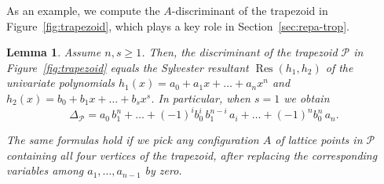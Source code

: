\documentclass[11pt]{amsart}
\numberwithin{equation}{section}
\theoremstyle{plain}
\newtheorem{lemma}[theorem]{Lemma}
\theoremstyle{definition}
\theoremstyle{remark}
\begin{document}
As an example, we compute the $A$-discriminant of the trapezoid in
Figure~\ref{fig:trapezoid}, which plays a key role in
Section~\ref{sec:repa-trop}. 
\begin{lemma}\label{lm:trapezoidDiscriminant}
  Assume $n,s\geq 1$. Then, the discriminant of the trapezoid ${\mathcal{P}}$ in
  Figure~\ref{fig:trapezoid} equals the Sylvester resultant
  $\operatorname{Res}(h_1,h_2)$ of the univariate polynomials
  $h_1(x)=a_0+a_1x+\ldots+a_nx^n$ and $h_2(x)=b_0+b_1x+\ldots+
  b_sx^s$. In particular, when $s=1$ we obtain
\begin{equation}
 \Delta_{\mathcal{P}}=a_0\,b_1^n+\ldots+(-1)^{i}b_0^i\,b_1^{n-i}\,a_i+\ldots +(-1)^n b_0^n\,a_n.\label{eq:3}
 \end{equation}

 The same formulas hold if we pick any configuration $A$ of lattice
 points in ${\mathcal{P}}$ containing all four vertices of the trapezoid, after
 replacing the corresponding variables among $a_1,\ldots, a_{n-1}$ by
 zero.
\end{lemma}
\end{document}
